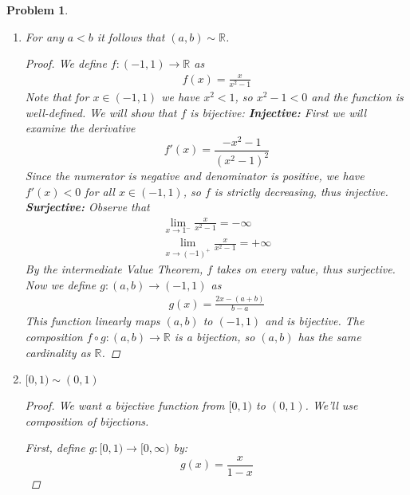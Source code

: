 \documentclass[12pt]{article}
\newtheorem{problem}{Problem}
\newcommand{\II}{\ensuremath{\mathbb I}}
\newcommand{\QQ}{\ensuremath{\mathbb Q}}
\newcommand{\RR}{\ensuremath{\mathbb R}}
\begin{document}
\begin{problem} %
\phantom{foo}

\renewcommand{\labelenumi}{(\alph{enumi})}
\begin{enumerate}
\item For any $a<b$ it follows that $(a,b) \sim \RR$.

\begin{proof}
We define $f : (-1,1) \rightarrow \RR$ as
\begin{align*}
  f(x) = \frac{x}{x^2 - 1}
\end{align*}
Note that for $x \in (-1,1)$ we have $x^2 < 1$, so $x^2 - 1 < 0$ and the function is well-defined. We will show that $f$ is bijective: \newline
\textbf{Injective: } First we will examine the derivative $$f'(x) = \frac{-x^2 - 1}{(x^2 - 1)^2}$$ Since the numerator is negative and denominator is positive, we have $f'(x) < 0$ for all $x \in (-1, 1)$, so $f$ is strictly decreasing, thus injective. \newline
\textbf{Surjective: } Observe that
\begin{align*}
  \lim_{x \to 1^-} \frac{x}{x^2-1} = -\infty \\
  \lim_{x \to (-1)^+} \frac{x}{x^2-1} = +\infty
\end{align*}
By the intermediate Value Theorem, $f$ takes on every value, thus surjective. \newline \newline
Now we define $g : (a,b) \rightarrow (-1,1)$ as
\begin{align*}
  g(x) = \frac{2x - (a + b)}{b - a}
\end{align*}
This function linearly maps $(a, b)$ to $(-1, 1)$ and is bijective. The composition $f \circ g : (a, b) \to \RR$ is a bijection, so $(a,b)$ has the same cardinality as $\RR$.
\end{proof}

\item $[0,1) \sim (0,1)$

\begin{proof}
We want a bijective function from $[0,1)$ to $(0,1)$. We'll use composition of bijections.

First, define $g: [0,1) \to [0,\infty)$ by:
$$g(x) = \frac{x}{1-x}$$


\end{proof}
\end{enumerate}
\end{problem}
\end{document}
